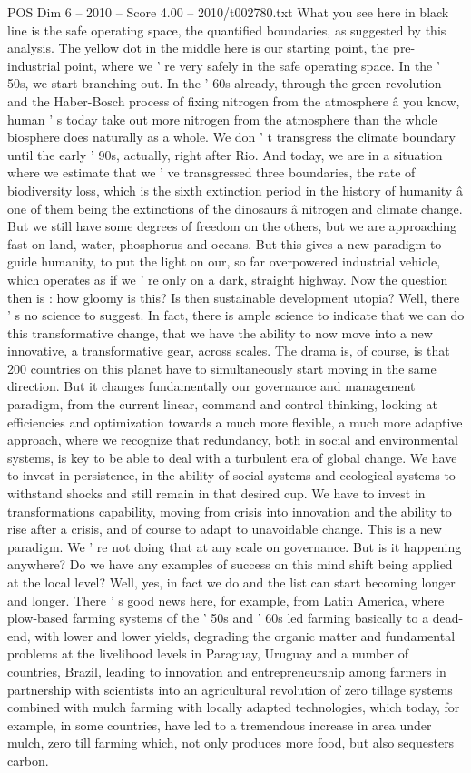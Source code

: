 \begin{textsample}{POS Dim 6 – 2010 – Score 4.00 – 2010/t002780.txt}
What you see here in black line is the safe operating space, the quantified boundaries, as suggested by this analysis.
The yellow dot in the middle here is our starting point, the pre- industrial point, where we ' re very safely in the safe operating space.
In the ' 50s, we start branching out.
In the ' 60s already, through the green revolution and the Haber-Bosch process of fixing nitrogen from the atmosphere â you know, human ' s today take out more nitrogen from the atmosphere than the whole biosphere does naturally as a whole.
We don ' t transgress the climate boundary until the early ' 90s, actually, right after Rio.
And today, we are in a situation where we estimate that we ' ve transgressed three boundaries, the rate of biodiversity loss, which is the sixth extinction period in the history of humanity â one of them being the extinctions of the dinosaurs â nitrogen and climate change.
But we still have some degrees of freedom on the others, but we are approaching fast on land, water, phosphorus and oceans.
But this gives a new paradigm to guide humanity, to put the light on our, so far overpowered industrial vehicle, which operates as if we ' re only on a dark, straight highway.
Now the question then is : how gloomy is this?
Is then sustainable development utopia?
Well, there ' s no science to suggest.
In fact, there is ample science to indicate that we can do this transformative change, that we have the ability to now move into a new innovative, a transformative gear, across scales.
The drama is, of course, is that 200 countries on this planet have to simultaneously start moving in the same direction.
But it changes fundamentally our governance and management paradigm, from the current linear, command and control thinking, looking at efficiencies and optimization towards a much more flexible, a much more adaptive approach, where we recognize that redundancy, both in social and environmental systems, is key to be able to deal with a turbulent era of global change.
We have to invest in persistence, in the ability of social systems and ecological systems to withstand shocks and still remain in that desired cup.
We have to invest in transformations capability, moving from crisis into innovation and the ability to rise after a crisis, and of course to adapt to unavoidable change.
This is a new paradigm.
We ' re not doing that at any scale on governance.
But is it happening anywhere?
Do we have any examples of success on this mind shift being applied at the local level?
Well, yes, in fact we do and the list can start becoming longer and longer.
There ' s good news here, for example, from Latin America, where plow-based farming systems of the ' 50s and ' 60s led farming basically to a dead-end, with lower and lower yields, degrading the organic matter and fundamental problems at the livelihood levels in Paraguay, Uruguay and a number of countries, Brazil, leading to innovation and entrepreneurship among farmers in partnership with scientists into an agricultural revolution of zero tillage systems combined with mulch farming with locally adapted technologies, which today, for example, in some countries, have led to a tremendous increase in area under mulch, zero till farming which, not only produces more food, but also sequesters carbon.

\end{textsample}
